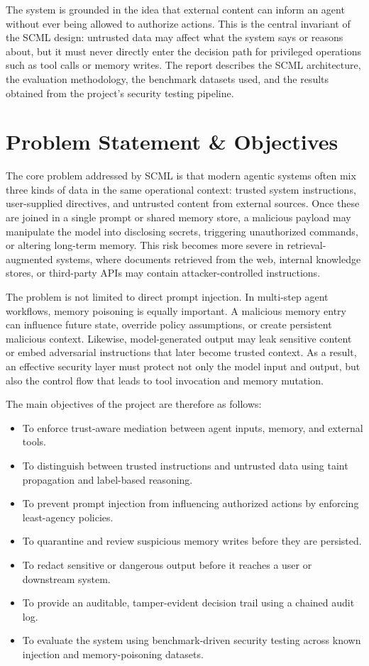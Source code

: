 \documentclass[12pt]{article}
\begin{document}
The system is grounded in the idea that external content can inform an agent without ever being allowed to authorize actions. This is the central invariant of the SCML design: untrusted data may affect what the system says or reasons about, but it must never directly enter the decision path for privileged operations such as tool calls or memory writes. The report describes the SCML architecture, the evaluation methodology, the benchmark datasets used, and the results obtained from the project’s security testing pipeline.

\section{Problem Statement \& Objectives}

The core problem addressed by SCML is that modern agentic systems often mix three kinds of data in the same operational context: trusted system instructions, user-supplied directives, and untrusted content from external sources. Once these are joined in a single prompt or shared memory store, a malicious payload may manipulate the model into disclosing secrets, triggering unauthorized commands, or altering long-term memory. This risk becomes more severe in retrieval-augmented systems, where documents retrieved from the web, internal knowledge stores, or third-party APIs may contain attacker-controlled instructions.

The problem is not limited to direct prompt injection. In multi-step agent workflows, memory poisoning is equally important. A malicious memory entry can influence future state, override policy assumptions, or create persistent malicious context. Likewise, model-generated output may leak sensitive content or embed adversarial instructions that later become trusted context. As a result, an effective security layer must protect not only the model input and output, but also the control flow that leads to tool invocation and memory mutation.

The main objectives of the project are therefore as follows:

\begin{itemize}
    \item To enforce trust-aware mediation between agent inputs, memory, and external tools.
    \item To distinguish between trusted instructions and untrusted data using taint propagation and label-based reasoning.
    \item To prevent prompt injection from influencing authorized actions by enforcing least-agency policies.
    \item To quarantine and review suspicious memory writes before they are persisted.
    \item To redact sensitive or dangerous output before it reaches a user or downstream system.
    \item To provide an auditable, tamper-evident decision trail using a chained audit log.
    \item To evaluate the system using benchmark-driven security testing across known injection and memory-poisoning datasets.
\end{itemize}
\end{document}
